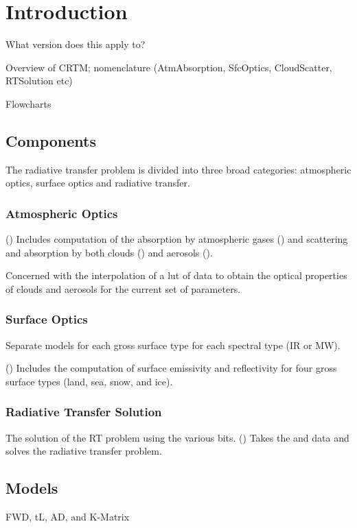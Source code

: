 \chapter{Introduction}

What version does this apply to?

Overview of CRTM; nomenclature (AtmAbsorption, SfcOptics, CloudScatter, RTSolution etc)

Flowcharts


\section{Components}
The radiative transfer problem is divided into three broad categories: atmospheric optics, surface optics and radiative transfer.

\subsection{Atmospheric Optics}
(\AtmOptics) Includes computation of the absorption by atmospheric gases (\AtmAbsorption) and scattering and absorption by both clouds (\CloudScatter) and aerosols (\AerosolScatter).

  Concerned with the interpolation of a lut of data to obtain the optical properties of clouds and aerosols for the current set of parameters.


\subsection{Surface Optics}
  Separate models for each gross surface type for each spectral type (IR or MW).

(\SfcOptics) Includes the computation of surface emissivity and reflectivity for four gross surface types (land, sea, snow, and ice).

\subsection{Radiative Transfer Solution}
  The solution of the RT problem using the various bits.
(\RTSolution) Takes the \AtmOptics{} and \SfcOptics{} data and solves the radiative transfer problem.


\section{Models}
FWD, tL, AD, and K-Matrix

